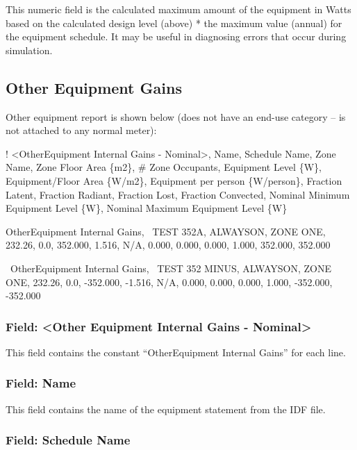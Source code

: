 This numeric field is the calculated maximum amount of the equipment in Watts based on the calculated design level (above) * the maximum value (annual) for the equipment schedule. It may be useful in diagnosing errors that occur during simulation.

\subsection{Other Equipment Gains}\label{other-equipment-gains}

Other equipment report is shown below (does not have an end-use category -- is not attached to any normal meter):

! \textless{}OtherEquipment Internal Gains - Nominal\textgreater{}, Name, Schedule Name, Zone Name, Zone Floor Area \{m2\}, \# Zone Occupants, Equipment Level \{W\}, Equipment/Floor Area \{W/m2\}, Equipment per person \{W/person\}, Fraction Latent, Fraction Radiant, Fraction Lost, Fraction Convected, Nominal Minimum Equipment Level \{W\}, Nominal Maximum Equipment Level \{W\}

OtherEquipment Internal Gains,~ TEST 352A, ALWAYSON, ZONE ONE, 232.26, 0.0, 352.000, 1.516, N/A, 0.000, 0.000, 0.000, 1.000, 352.000, 352.000

~OtherEquipment Internal Gains,~ TEST 352 MINUS, ALWAYSON, ZONE ONE, 232.26, 0.0, -352.000, -1.516, N/A, 0.000, 0.000, 0.000, 1.000, -352.000, -352.000

\subsubsection{Field: \textless{}Other Equipment Internal Gains - Nominal\textgreater{}}\label{field-other-equipment-internal-gains---nominal}

This field contains the constant ``OtherEquipment Internal Gains'' for each line.

\subsubsection{Field: Name}\label{field-name-4}

This field contains the name of the equipment statement from the IDF file.

\subsubsection{Field: Schedule Name}\label{field-schedule-name-3}

